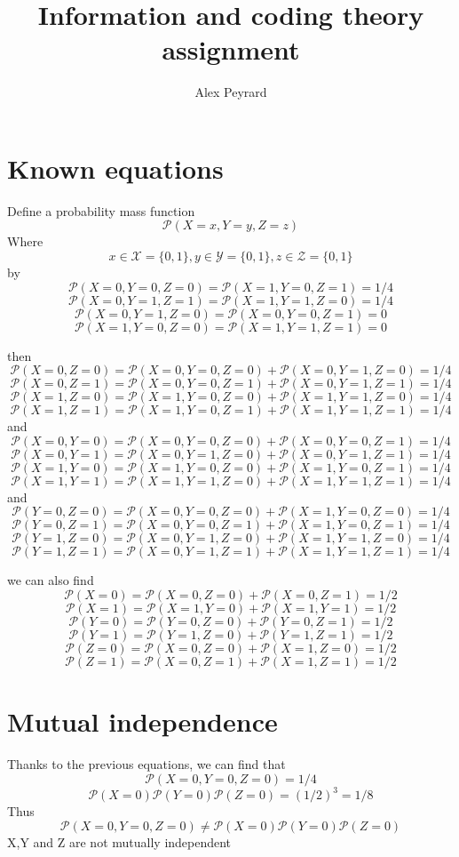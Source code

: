 \documentclass[10pt]{article}
\author{Alex Peyrard}
\title{Information and coding theory assignment}
\begin{document}
\maketitle
\section{Known equations}
Define a probability mass function
\[\mathcal{P}(X=x,Y=y,Z=z)\]
Where \[x\in \mathcal{X} = \{0,1\}, y\in \mathcal{Y} = \{0,1\}, z\in \mathcal{Z} = \{0,1\}\]
by
\[\mathcal{P}(X=0,Y=0,Z=0)=\mathcal{P}(X=1,Y=0,Z=1)=1/4\]
\[\mathcal{P}(X=0,Y=1,Z=1)=\mathcal{P}(X=1,Y=1,Z=0)=1/4\]
\[\mathcal{P}(X=0,Y=1,Z=0)=\mathcal{P}(X=0,Y=0,Z=1)=0\]
\[\mathcal{P}(X=1,Y=0,Z=0)=\mathcal{P}(X=1,Y=1,Z=1)=0\]

then
\[\mathcal{P}(X=0,Z=0)=\mathcal{P}(X=0,Y=0,Z=0)+\mathcal{P}(X=0,Y=1,Z=0)=1/4\]
\[\mathcal{P}(X=0,Z=1)=\mathcal{P}(X=0,Y=0,Z=1)+\mathcal{P}(X=0,Y=1,Z=1)=1/4\]
\[\mathcal{P}(X=1,Z=0)=\mathcal{P}(X=1,Y=0,Z=0)+\mathcal{P}(X=1,Y=1,Z=0)=1/4\]
\[\mathcal{P}(X=1,Z=1)=\mathcal{P}(X=1,Y=0,Z=1)+\mathcal{P}(X=1,Y=1,Z=1)=1/4\]
and
\[\mathcal{P}(X=0,Y=0)=\mathcal{P}(X=0,Y=0,Z=0)+\mathcal{P}(X=0,Y=0,Z=1)=1/4\]
\[\mathcal{P}(X=0,Y=1)=\mathcal{P}(X=0,Y=1,Z=0)+\mathcal{P}(X=0,Y=1,Z=1)=1/4\]
\[\mathcal{P}(X=1,Y=0)=\mathcal{P}(X=1,Y=0,Z=0)+\mathcal{P}(X=1,Y=0,Z=1)=1/4\]
\[\mathcal{P}(X=1,Y=1)=\mathcal{P}(X=1,Y=1,Z=0)+\mathcal{P}(X=1,Y=1,Z=1)=1/4\]
and
\[\mathcal{P}(Y=0,Z=0)=\mathcal{P}(X=0,Y=0,Z=0)+\mathcal{P}(X=1,Y=0,Z=0)=1/4\]
\[\mathcal{P}(Y=0,Z=1)=\mathcal{P}(X=0,Y=0,Z=1)+\mathcal{P}(X=1,Y=0,Z=1)=1/4\]
\[\mathcal{P}(Y=1,Z=0)=\mathcal{P}(X=0,Y=1,Z=0)+\mathcal{P}(X=1,Y=1,Z=0)=1/4\]
\[\mathcal{P}(Y=1,Z=1)=\mathcal{P}(X=0,Y=1,Z=1)+\mathcal{P}(X=1,Y=1,Z=1)=1/4\]

we can also find
\[\mathcal{P}(X=0)=\mathcal{P}(X=0,Z=0)+\mathcal{P}(X=0,Z=1)=1/2\]
\[\mathcal{P}(X=1)=\mathcal{P}(X=1,Y=0)+\mathcal{P}(X=1,Y=1)=1/2\]
\[\mathcal{P}(Y=0)=\mathcal{P}(Y=0,Z=0)+\mathcal{P}(Y=0,Z=1)=1/2\]
\[\mathcal{P}(Y=1)=\mathcal{P}(Y=1,Z=0)+\mathcal{P}(Y=1,Z=1)=1/2\]
\[\mathcal{P}(Z=0)=\mathcal{P}(X=0,Z=0)+\mathcal{P}(X=1,Z=0)=1/2\]
\[\mathcal{P}(Z=1)=\mathcal{P}(X=0,Z=1)+\mathcal{P}(X=1,Z=1)=1/2\]

\section{Mutual independence}
Thanks to the previous equations, we can find that
\[\mathcal{P}(X=0,Y=0,Z=0)=1/4\]
\[\mathcal{P}(X=0)\mathcal{P}(Y=0)\mathcal{P}(Z=0)=(1/2)^3=1/8\]
Thus
\[\mathcal{P}(X=0,Y=0,Z=0)\neq\mathcal{P}(X=0)\mathcal{P}(Y=0)\mathcal{P}(Z=0)\]
X,Y and Z are not mutually independent
\end{document}
